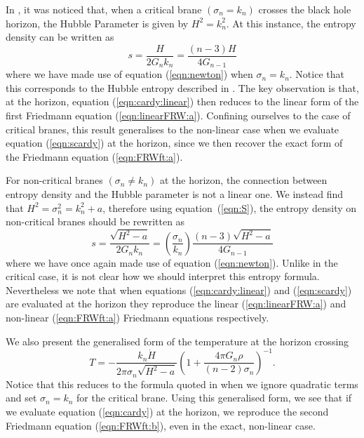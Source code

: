 \documentclass[a4paper,12pt]{article}
\begin{document}
In \cite{Savonije:braneCFT}, it was noticed that, when a critical
brane $(\sigma_n=k_n)$ crosses the black hole horizon, the Hubble
Parameter is given by $H^2=k_n^2$. At this instance, the entropy
density can be written as
\begin{equation} \label{eqn:entropy}
s=\frac{H}{2G_n k_n}=\frac{(n-3)H}{4G_{n-1}}
\end{equation}
where we have made use of equation (\ref{eqn:newton}) when
$\sigma_n=k_n$. Notice that this corresponds to the Hubble entropy
described in \cite{Verlinde:radiation}.  The key observation is that,
at the horizon, equation (\ref{eqn:cardy:linear}) then reduces to the
linear form of the first Friedmann equation (\ref{eqn:linearFRW:a}).
Confining ourselves to the case of critical branes, this result
generalises to the non-linear case when we evaluate equation
(\ref{eqn:scardy}) at the horizon, since we then recover the exact
form of the Friedmann equation (\ref{eqn:FRWft:a}).

For non-critical branes $(\sigma_n \neq k_n)$ at the horizon, the
connection between entropy density and the Hubble parameter is not a
linear one.  We instead find that $H^2=\sigma_n^2=k_n^2+a$, therefore
using equation~(\ref{eqn:S}), the entropy density on non-critical
branes should be rewritten as
\begin{equation} \label{eqn:s2}
s=\frac{\sqrt{H^2-a}}{2G_n k_n}=\left(\frac{\sigma_n}{k_n}
\right)\frac{(n-3)\sqrt{H^2-a}}{4 G_{n-1}}
\end{equation}
where we have once again made use of equation
(\ref{eqn:newton}). Unlike in the critical case, it is not clear how
we should interpret this entropy formula. Nevertheless we note that
when equations (\ref{eqn:cardy:linear}) and (\ref{eqn:scardy}) are
evaluated at the horizon they reproduce the linear
(\ref{eqn:linearFRW:a}) and non-linear (\ref{eqn:FRWft:a}) Friedmann
equations respectively.

We also present the generalised form of the temperature at the horizon
crossing
\begin{equation} \label{eqn:T2}
T=-\frac{k_n\dot{H}}{2\pi\sigma_n\sqrt{H^2-a}} \left(1+\frac{4\pi
 G_n\rho}{(n-2)\sigma_n}\right)^{-1}.
\end{equation}
Notice that this reduces to the formula quoted in
\cite{Savonije:braneCFT} when we ignore quadratic terms and set
$\sigma_n=k_n$ for the critical brane. Using this generalised form, we
see that if we evaluate equation (\ref{eqn:cardy}) at the horizon, we
reproduce the second Friedmann equation (\ref{eqn:FRWft:b}), even in
the exact, non-linear case.
\end{document}
